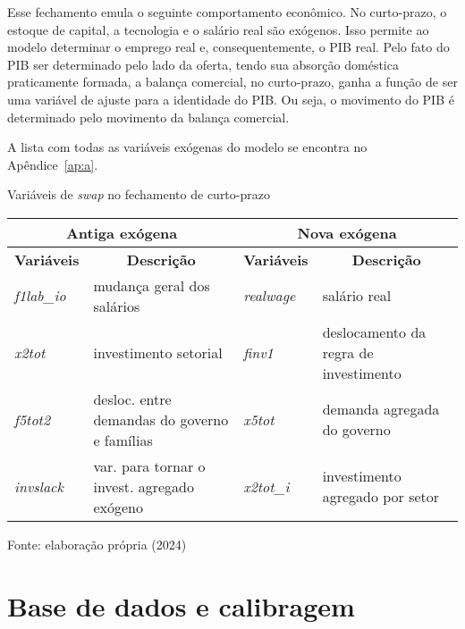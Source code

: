 Esse fechamento emula o seguinte comportamento econômico. No curto-prazo, o estoque de capital, a tecnologia e o salário real são exógenos. Isso permite ao modelo determinar o emprego real e, consequentemente, o PIB real. Pelo fato do PIB ser determinado pelo lado da oferta, tendo sua absorção doméstica praticamente formada, a balança comercial, no curto-prazo, ganha a função de ser uma variável de ajuste para a identidade do PIB. Ou seja, o movimento do PIB é determinado pelo movimento da balança comercial.

A lista com todas as variáveis exógenas do modelo se encontra no Apêndice~\ref{ap:a}.


\begin{quadro}[h]
	\centering
	\begin{threeparttable}
		\caption{Variáveis de \textit{swap} no fechamento de curto-prazo} \label{quad:fechamento}
		\footnotesize
		\begin{tabular}{||l m{6.5cm} |l m{5.5cm} ||}
			\hline \hline
			\multicolumn{2}{||c|}{\textbf{Antiga exógena}}                     & \multicolumn{2}{c||}{\textbf{Nova exógena}} \\ \hline
			\textbf{Variáveis} & \multicolumn{1}{c|}{\textbf{Descrição}}      & \textbf{Variáveis} & \multicolumn{1}{c||}{\textbf{Descrição}} \\ \hline
			\textit{f1lab\_io}  & mudança geral dos salários                  & \textit{realwage}  & salário real \\
			\textit{x2tot}     & investimento setorial                        & \textit{finv1}     & deslocamento da regra de investimento \\
			\textit{f5tot2}    & desloc. entre demandas do governo e famílias & \textit{x5tot}     & demanda agregada do governo \\
			\textit{invslack}  & var. para tornar o invest. agregado exógeno  & \textit{x2tot\_i}  & investimento agregado por setor \\ \hline \hline
		\end{tabular}
		\begin{tablenotes}
			\scriptsize
			\item Fonte: elaboração própria (2024)
		\end{tablenotes}
	\end{threeparttable}
\end{quadro}


\section{Base de dados e calibragem} \label{sec:dados_egc}

